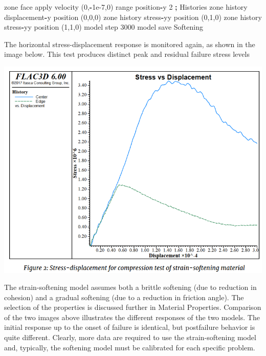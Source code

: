 \documentclass[a4paper, nobind]{templates/ociamthesis}
\newenvironment{Shaded}{\begin{snugshade}}{\end{snugshade}}
\newcommand{\BuiltInTok}[1]{#1}
\newcommand{\DecValTok}[1]{\textcolor[rgb]{0.00,0.00,0.81}{#1}}
\newcommand{\FloatTok}[1]{\textcolor[rgb]{0.00,0.00,0.81}{#1}}
\newcommand{\NormalTok}[1]{#1}
\newcommand{\OperatorTok}[1]{\textcolor[rgb]{0.81,0.36,0.00}{\textbf{#1}}}
\newcommand{\StringTok}[1]{\textcolor[rgb]{0.31,0.60,0.02}{#1}}
\renewenvironment{Shaded}
{
  \vspace{10pt}%
  \begin{snugshade}%
}{%
  \end{snugshade}%
  \vspace{8pt}%
}
\begin{document}
\begin{Shaded}
\begin{Highlighting}[]
\NormalTok{zone face }\BuiltInTok{apply}\NormalTok{ velocity (}\DecValTok{0}\NormalTok{,}\OperatorTok{{-}}\FloatTok{1e{-}7}\NormalTok{,}\DecValTok{0}\NormalTok{) }\BuiltInTok{range}\NormalTok{ position}\OperatorTok{{-}}\NormalTok{y }\DecValTok{2}
\OperatorTok{;}\NormalTok{ Histories}
\NormalTok{zone history displacement}\OperatorTok{{-}}\NormalTok{y position (}\DecValTok{0}\NormalTok{,}\DecValTok{0}\NormalTok{,}\DecValTok{0}\NormalTok{)}
\NormalTok{zone history stress}\OperatorTok{{-}}\NormalTok{yy position (}\DecValTok{0}\NormalTok{,}\DecValTok{1}\NormalTok{,}\DecValTok{0}\NormalTok{)}
\NormalTok{zone history stress}\OperatorTok{{-}}\NormalTok{yy position (}\DecValTok{1}\NormalTok{,}\DecValTok{1}\NormalTok{,}\DecValTok{0}\NormalTok{)}
\NormalTok{model step }\DecValTok{3000}
\NormalTok{model save }\StringTok{\textquotesingle{}Softening\textquotesingle{}}
\end{Highlighting}
\end{Shaded}

The horizontal stress-displacement response is monitored again, as shown
in the image below. This test produces distinct peak and residual
failure stress levels

\includegraphics[width=1\linewidth]{myfigureeeeee/softening}

The strain-softening model assumes both a brittle softening (due to
reduction in cohesion) and a gradual softening (due to a reduction in
friction angle). The selection of the properties is discussed further in
Material Properties. Comparison of the two images above illustrates the
different responses of the two models. The initial response up to the
onset of failure is identical, but postfailure behavior is quite
different. Clearly, more data are required to use the strain-softening
model and, typically, the softening model must be calibrated for each
specific problem.
\end{document}
